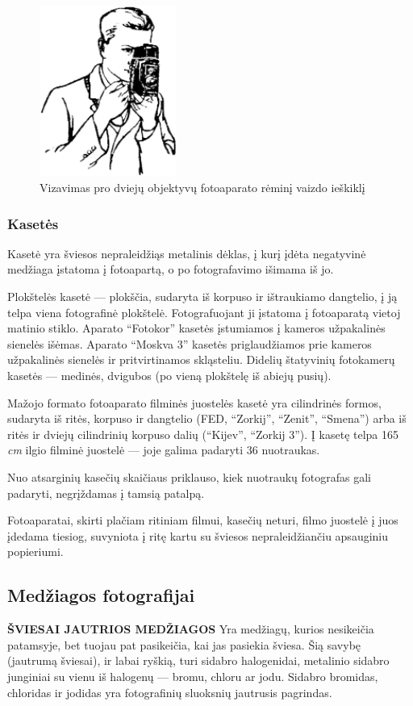 \documentclass{book}
\begin{document}
					\begin{figure}[h]
						\centering
						\includegraphics[width=0.4\textwidth]{13-pav}
						\caption{Vizavimas pro dviejų objektyvų fotoaparato rėminį vaizdo ieškiklį}
						\label{fig:13}
					\end{figure}
				\subsubsection*{Kasetės}
					Kasetė yra šviesos nepraleidžiąs metalinis dėklas, į kurį įdėta negatyvinė medžiaga įstatoma į fotoapartą, o po fotografavimo išimama iš jo.

					Plokštelės kasetė --- plokščia, sudaryta iš korpuso ir ištraukiamo dangtelio, į ją telpa viena fotografinė plokštelė. Fotografuojant ji įstatoma į fotoaparatą vietoj matinio stiklo. Aparato ``Fotokor'' kasetės įstumiamos į kameros užpakalinės sienelės išėmas. Aparato ``Moskva 3'' kasetės priglaudžiamos prie kameros užpakalinės sienelės ir pritvirtinamos skląsteliu. Didelių štatyvinių fotokamerų kasetės --- medinės, dvigubos (po vieną plokštelę iš abiejų pusių).

					Mažojo formato fotoaparato filminės juostelės kasetė yra cilindrinės formos, sudaryta iš ritės, korpuso ir dangtelio (FED, ``Zorkij'', ``Zenit'', ``Smena'') arba iš ritės ir dviejų cilindrinių korpuso dalių (``Kijev'', ``Zorkij 3''). Į kasetę telpa 165 \textit{cm} ilgio filminė juostelė --- joje galima padaryti 36 nuotraukas.

					Nuo atsarginių kasečių skaičiaus priklauso, kiek nuotraukų fotografas gali padaryti, negrįždamas į tamsią patalpą.

					Fotoaparatai, skirti plačiam ritiniam filmui, kasečių neturi, filmo juostelė į juos įdedama tiesiog, suvyniota į ritę kartu su šviesos nepraleidžiančiu apsauginiu popieriumi.
			\subsection*{Medžiagos fotografijai}
				\textbf{ŠVIESAI JAUTRIOS MEDŽIAGOS}
				Yra medžiagų, kurios nesikeičia patamsyje, bet tuojau pat pasikeičia, kai jas pasiekia šviesa. Šią savybę (jautrumą šviesai), ir labai ryškią, turi sidabro halogenidai, metalinio sidabro junginiai su vienu iš halogenų --- bromu, chloru ar jodu. Sidabro bromidas, chloridas ir jodidas yra fotografinių sluoksnių jautrusis pagrindas.
\end{document}
